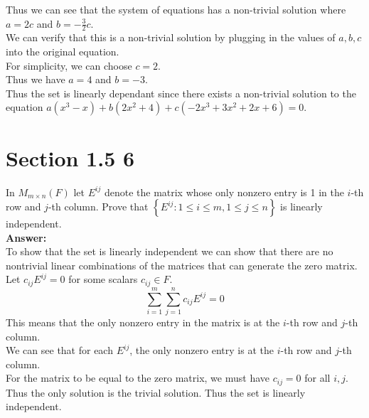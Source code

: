 \documentclass{article}
\begin{document}
Thus we can see that the system of equations has a non-trivial solution where $a = 2c$ and $b = -\frac{3}{2}c$.\\
We can verify that this is a non-trivial solution by plugging in the values of $a,b,c$ into the original equation.\\
For simplicity, we can choose $c = 2$.\\
Thus we have $a = 4$ and $b = -3$.\\
Thus the set is linearly dependant since there exists a non-trivial solution to the equation $a(x^3 - x) + b(2x^2 + 4) + c(-2x^3 + 3x^2 + 2x + 6) = 0$.

\section*{Section 1.5 6}
In $M_{m \times n}(F) $ let $E^{ij}$ denote the matrix whose only nonzero entry is 1 in the $i$-th row and $j$-th column. Prove that $\left\{E^{ij}: 1 \leq i \leq m, 1 \leq j \leq n \right\}$ is linearly independent.\\
\textbf{Answer:} \\
To show that the set is linearly independent we can show that there are no nontrivial linear combinations of the matrices that can generate the zero matrix.\\
Let $c_{ij}E^{ij} = 0$ for some scalars $c_{ij} \in F$.\\
$$ \sum_{i=1}^{m} \sum_{j=1}^{n} c_{ij}E^{ij} = 0$$
This means that the only nonzero entry in the matrix is at the $i$-th row and $j$-th column.\\
We can see that for each $E^{ij}$, the only nonzero entry is at the $i$-th row and $j$-th column.\\
For the matrix to be equal to the zero matrix, we must have $c_{ij} = 0$ for all $i,j$.\\
Thus the only solution is the trivial solution. Thus the set is linearly independent.\\
\end{document}
